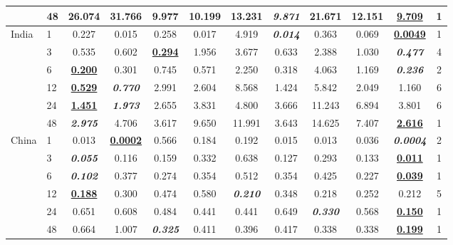 \begin{table}[!htbp]
\begin{adjustbox}{width=\textwidth}
\begin{tabular}{llcccccccccc}
 & 48 & 26.074 & 31.766 & 9.977 & 10.199 & 13.231 & \textbf{\textit{9.871}} & 21.671 & 12.151 & \textbf{\underline{9.709}} & 1 \\
\hline
\multirow{6}{*}{India} & 1 & 0.227 & 0.015 & 0.258 & 0.017 & 4.919 & \textbf{\textit{0.014}} & 0.363 & 0.069 & \textbf{\underline{0.0049}} & 1 \\
 & 3 & 0.535 & 0.602 & \textbf{\underline{0.294}} & 1.956 & 3.677 & 0.633 & 2.388 & 1.030 & \textbf{\textit{0.477}} & 4 \\
 & 6 & \textbf{\underline{0.200}} & 0.301 & 0.745 & 0.571 & 2.250 & 0.318 & 4.063 & 1.169 & \textbf{\textit{0.236}} & 2 \\
 & 12 & \textbf{\underline{0.529}} & \textbf{\textit{0.770}} & 2.991 & 2.604 & 8.568 & 1.424 & 5.842 & 2.049 & 1.160 & 6 \\
 & 24 & \textbf{\underline{1.451}} & \textbf{\textit{1.973}} & 2.655 & 3.831 & 4.800 & 3.666 & 11.243 & 6.894 & 3.801 & 6 \\
 & 48 & \textbf{\textit{2.975}} & 4.706 & 3.617 & 9.650 & 11.991 & 3.643 & 14.625 & 7.407 & \textbf{\underline{2.616}} & 1 \\
\hline
\multirow{6}{*}{China} & 1 & 0.013 & \textbf{\underline{0.0002}} & 0.566 & 0.184 & 0.192 & 0.015 & 0.013 & 0.036 & \textbf{\textit{0.0004}} & 2 \\
 & 3 & \textbf{\textit{0.055}} & 0.116 & 0.159 & 0.332 & 0.638 & 0.127 & 0.293 & 0.133 & \textbf{\underline{0.011}} & 1 \\
 & 6 & \textbf{\textit{0.102}} & 0.377 & 0.274 & 0.354 & 0.512 & 0.354 & 0.425 & 0.227 & \textbf{\underline{0.039}} & 1 \\
 & 12 & \textbf{\underline{0.188}} & 0.300 & 0.474 & 0.580 & \textbf{\textit{0.210}} & 0.348 & 0.218 & 0.252 & 0.212 & 5 \\
 & 24 & 0.651 & 0.608 & 0.484 & 0.441 & 0.441 & 0.649 & \textbf{\textit{0.330}} & 0.568 & \textbf{\underline{0.150}} & 1 \\
 & 48 & 0.664 & 1.007 & \textbf{\textit{0.325}} & 0.411 & 0.396 & 0.417 & 0.338 & 0.338 & \textbf{\underline{0.199}} & 1 \\
\hline
\end{tabular}
\end{adjustbox}
\label{tab:additional_baselines_rmse}
\end{table}
